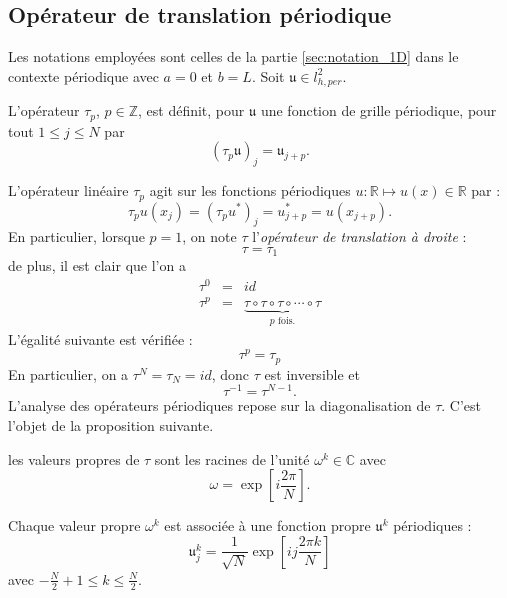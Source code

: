 \subsection{Opérateur de translation périodique}
Les notations employées sont celles de la partie \ref{sec:notation_1D} dans le contexte périodique avec $a=0$ et $b=L$. Soit $\mathfrak{u} \in l^2_{h,per}$.

\begin{definition}
L'opérateur $\tau_p$, $p \in \mathbb{Z}$, est définit, pour $\mathfrak{u}$ une fonction de grille périodique, pour tout $1 \leq j \leq N$ par
\begin{equation}
(\tau_p \mathfrak{u})_j = \mathfrak{u}_{j+p}.
\end{equation}
\end{definition}
L'opérateur linéaire $\tau_p$ agit sur les fonctions périodiques $u : \mathbb{R} \mapsto u(x) \in \mathbb{R}$ par :
\begin{equation}
\tau_p u(x_j) = (\tau_p u^*)_j = u^*_{j+p} = u(x_{j+p}).
\end{equation}
En particulier, lorsque $p=1$, on note $\tau$ l'\textit{opérateur de translation à droite} :
\begin{equation}
\tau = \tau_{1}
\end{equation}
de plus, il est clair que l'on a
\begin{equation}
\begin{array}{rcl}
\tau^0 & = & id\\
\tau^p & = & \underbrace{\tau \circ \tau \circ \tau \circ \cdots \circ \tau}_{p \text{ fois.}}
\end{array}
\end{equation}
L'égalité suivante est vérifiée :
\begin{equation}
\tau^p = \tau_p
\end{equation}
En particulier, on a $\tau^N = \tau_N = id$, donc $\tau$ est inversible et
\begin{equation}
\tau^{-1} = \tau^{N-1}.
\end{equation}
L'analyse des opérateurs périodiques repose sur la diagonalisation de $\tau$. C'est l'objet de la proposition suivante.

\begin{proposition}
les valeurs propres de $\tau$ sont les racines de l'unité $\omega^k \in \mathbb{C}$ avec
\begin{equation}
\omega = \exp \left[ i \dfrac{2 \pi}{N} \right].
\end{equation}

Chaque valeur propre $\omega^k$ est associée à une fonction propre $\mathfrak{u}^k$ périodiques :
\begin{equation}
\mathfrak{u}_j^k = \dfrac{1}{\sqrt{N}}  \exp \left[ i j \dfrac{2 \pi k}{N} \right]
\label{eq:vecteurpropre_tau}
\end{equation}
avec $-\frac{N}{2}+1 \leq k \leq \frac{N}{2}$.
\label{prop:eigenvaluevector_tau}
\end{proposition}

